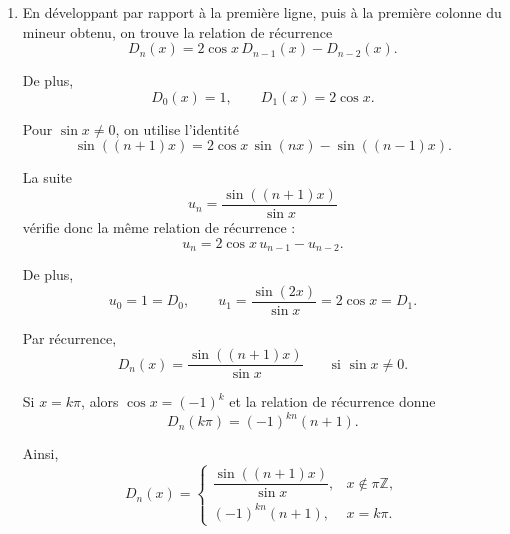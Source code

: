 \documentclass[12pt, a4paper]{article}
\begin{document}
\begin{enumerate}
    On obtient alors
    \[
    \det(C)
    =
    (n-1)
    \left|
    \begin{array}{ccccc}
    1&0&0&\cdots&0\\
    1&-1&0&\cdots&0\\
    1&0&-1&\cdots&0\\
    \vdots&\vdots&\vdots&\ddots&\vdots\\
    1&0&0&\cdots&-1
    \end{array}
    \right|.
    \]

    La matrice est triangulaire, donc
    \[
    \det(C)=(n-1)(-1)^{n-1}.
    \]

    Ainsi
    \[
    \boxed{\det(B)=(-1)^{n-1}(n-1)\det(A).}
    \]

    \pagebreak 

  \item 
    En développant par rapport à la première ligne, puis à la première colonne du
mineur obtenu, on trouve la relation de récurrence
    \[
    \boxed{D_n(x)=2\cos x\,D_{n-1}(x)-D_{n-2}(x)}.
    \]

    De plus,
    \[
    D_0(x)=1,
    \qquad
    D_1(x)=2\cos x.
    \]

    Pour $\sin x\neq 0$, on utilise l'identité
    \[
    \sin((n+1)x)
    =
    2\cos x\,\sin(nx)-\sin((n-1)x).
    \]

    La suite
    \[
    u_n=\frac{\sin((n+1)x)}{\sin x}
    \]
    vérifie donc la même relation de récurrence :
    \[
    u_n=2\cos x\,u_{n-1}-u_{n-2}.
    \]

    De plus,
    \[
    u_0=1=D_0,
    \qquad
    u_1=\frac{\sin(2x)}{\sin x}=2\cos x=D_1.
    \]

    Par récurrence,
    \[
    \boxed{
    D_n(x)=\frac{\sin((n+1)x)}{\sin x}
    }
    \qquad \text{si } \sin x\neq 0.
    \]

    Si $x=k\pi$, alors $\cos x=(-1)^k$ et la relation de récurrence donne
    \[
    \boxed{D_n(k\pi)=(-1)^{kn}(n+1)}.
    \]

    Ainsi,
    \[
    \boxed{
    D_n(x)=
    \begin{cases}
    \dfrac{\sin((n+1)x)}{\sin x},
    & x\notin \pi\mathbb Z,\\[6pt]
    (-1)^{kn}(n+1),
    & x=k\pi.
    \end{cases}
    }
    \]
  \pagebreak 


\end{enumerate}
\end{document}
